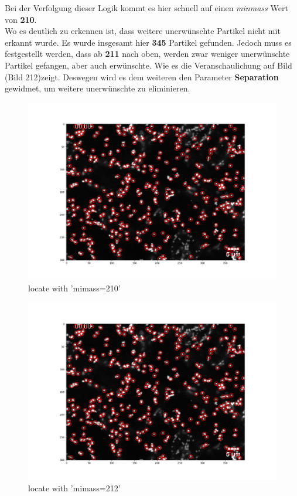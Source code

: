 \begin{enumerate}
Bei der Verfolgung dieser Logik kommt es hier schnell auf einen \textit{minmass} Wert von \textbf{210}.\\
Wo es deutlich zu erkennen ist, dass weitere unerwünschte Partikel nicht mit erkannt wurde. Es wurde insgesamt hier \textbf{345} Partikel gefunden. Jedoch muss es festgestellt werden, dass ab \textbf{211} nach oben, werden zwar weniger unerwünschte Partikel gefangen, aber auch erwünschte. 
Wie es die Veranschaulichung auf Bild (Bild 212)zeigt. 
Deswegen wird es dem weiteren  den Parameter  \textbf{Separation} gewidmet, um weitere unerwünschte zu eliminieren.

\begin{figure}[H]
    \centering
    \includegraphics[scale=0.35]{Grafiken/trackpyBilder/locate_with_minmass_07(210).png}
    \caption{locate with 'mimass=210'}
\end{figure}


\begin{figure}[H]
    \centering
    \includegraphics[scale=0.35]{Grafiken/trackpyBilder/locate_with_minmass_08(212).png}
    \caption{locate with 'mimass=212'}
\end{figure}



\end{enumerate}
